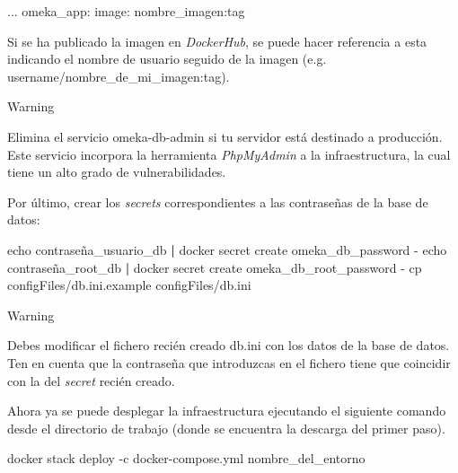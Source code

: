 \documentclass[
]{article}
\newenvironment{Shaded}{}{}
\newcommand{\BuiltInTok}[1]{#1}
\newcommand{\ExtensionTok}[1]{#1}
\newcommand{\FunctionTok}[1]{\textcolor[rgb]{0.02,0.16,0.49}{#1}}
\newcommand{\KeywordTok}[1]{\textcolor[rgb]{0.00,0.44,0.13}{\textbf{#1}}}
\newcommand{\NormalTok}[1]{#1}
\newcommand{\StringTok}[1]{\textcolor[rgb]{0.25,0.44,0.63}{#1}}
\begin{document}
\begin{Shaded}
\begin{Highlighting}[]
\ExtensionTok{...}
  \ExtensionTok{omeka\_app}\NormalTok{:}
    \ExtensionTok{image}\NormalTok{: nombre\_imagen:tag}
\end{Highlighting}
\end{Shaded}

Si se ha publicado la imagen en \emph{DockerHub}, se puede hacer
referencia a esta indicando el nombre de usuario seguido de la imagen
(e.g. username/nombre\_de\_mi\_imagen:tag).

Warning

Elimina el servicio {omeka-db-admin} si tu servidor está destinado a
producción. Este servicio incorpora la herramienta \emph{PhpMyAdmin} a
la infraestructura, la cual tiene un alto grado de vulnerabilidades.

Por último, crear los \emph{secrets} correspondientes a las contraseñas
de la base de datos:

\begin{Shaded}
\begin{Highlighting}[]
\BuiltInTok{echo} \StringTok{\textquotesingle{}contraseña\_usuario\_db\textquotesingle{}} \KeywordTok{|} \ExtensionTok{docker}\NormalTok{ secret create omeka\_db\_password {-}}
\BuiltInTok{echo} \StringTok{\textquotesingle{}contraseña\_root\_db\textquotesingle{}} \KeywordTok{|} \ExtensionTok{docker}\NormalTok{ secret create omeka\_db\_root\_password {-}}
\FunctionTok{cp}\NormalTok{ configFiles/db.ini.example configFiles/db.ini}
\end{Highlighting}
\end{Shaded}

Warning

Debes modificar el fichero recién creado {db.ini} con los datos de la
base de datos. Ten en cuenta que la contraseña que introduzcas en el
fichero tiene que coincidir con la del \emph{secret} recién creado.

Ahora ya se puede desplegar la infraestructura ejecutando el siguiente
comando desde el directorio de trabajo (donde se encuentra la descarga
del primer paso).

\begin{Shaded}
\begin{Highlighting}[]
\ExtensionTok{docker}\NormalTok{ stack deploy {-}c docker{-}compose.yml nombre\_del\_entorno}
\end{Highlighting}
\end{Shaded}
\end{document}
